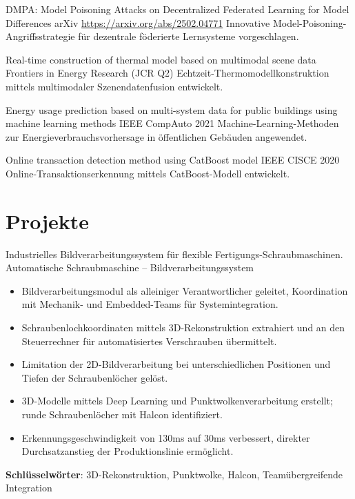 \documentclass[a4paper, serif, 10pt]{moderncv}
\begin{document}
        {DMPA: Model Poisoning Attacks on Decentralized Federated Learning for Model Differences}
        {arXiv}
        {\url{https://arxiv.org/abs/2502.04771}}
        {}
        {Innovative Model-Poisoning-Angriffsstrategie für dezentrale föderierte Lernsysteme vorgeschlagen.}

        {Real-time construction of thermal model based on multimodal scene data}
        {Frontiers in Energy Research (JCR Q2)}
        {}
        {}
        {Echtzeit-Thermomodellkonstruktion mittels multimodaler Szenendatenfusion entwickelt.}

        {Energy usage prediction based on multi-system data for public buildings using machine learning methods}
        {IEEE CompAuto 2021}
        {}
        {}
        {Machine-Learning-Methoden zur Energieverbrauchsvorhersage in öffentlichen Gebäuden angewendet.}

        {Online transaction detection method using CatBoost model}
        {IEEE CISCE 2020}
        {}
        {}
        {Online-Transaktionserkennung mittels CatBoost-Modell entwickelt.}

\section{Projekte}

        {Industrielles Bildverarbeitungssystem für flexible Fertigungs-Schraubmaschinen.}
        {Automatische Schraubmaschine – Bildverarbeitungssystem}
        {}
        {}
        {\begin{itemize}
\item Bildverarbeitungsmodul als alleiniger Verantwortlicher geleitet, Koordination mit Mechanik- und Embedded-Teams für Systemintegration.
\item Schraubenlochkoordinaten mittels 3D-Rekonstruktion extrahiert und an den Steuerrechner für automatisiertes Verschrauben übermittelt.
\item Limitation der 2D-Bildverarbeitung bei unterschiedlichen Positionen und Tiefen der Schraubenlöcher gelöst.
\item 3D-Modelle mittels Deep Learning und Punktwolkenverarbeitung erstellt; runde Schraubenlöcher mit Halcon identifiziert.
\item Erkennungsgeschwindigkeit von 130ms auf 30ms verbessert, direkter Durchsatzanstieg der Produktionslinie ermöglicht.
\end{itemize}
\textbf{Schlüsselwörter}: 3D-Rekonstruktion, Punktwolke, Halcon, Teamübergreifende Integration}
\end{document}
